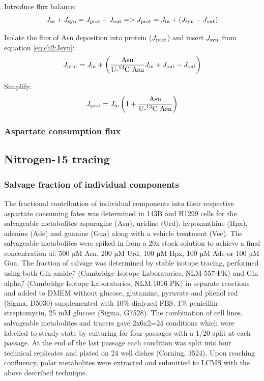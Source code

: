 Introduce flux balance:
\begin{equation}
    J_{\text{in}} + J_{\text{syn}} = J_{\text{prot}} + J_{\text{out}} => J_{\text{prot}} = J_{\text{in}} + (J_{\text{syn}} - J_{\text{out}})
\end{equation}

Isolate the flux of Asn deposition into protein ($J_{\text{prot}}$) and insert $J_{\text{syn}}$ from equation \ref{eq:ch2:Jsyn}:
\begin{equation}
    J_{\text{prot}} = J_{\text{in}} + \left( \frac{\text{Asn}}{\text{U-\textsuperscript{13}C Asn}} J_{\text{in}} + J_{\text{out}} - J_{\text{out}} \right)
\end{equation}

Simplify:
\begin{equation}
    J_{\text{prot}} = J_{\text{in}} \left( 1 + \frac{\text{Asn}}{\text{U-\textsuperscript{13}C Asn}} \right)
\label{eq:ch2:Jprot}
\end{equation}



\subsubsection{Aspartate consumption flux}











\subsection{Nitrogen-15 tracing}

\subsubsection{Salvage fraction of individual components}
The fractional contribution of individual components into their respective aspartate consuming fates was determined in 143B and H1299 cells for the salvageable metabolites asparagine (Asn), uridine (Urd), hypoxanthine (Hpx), adenine (Ade) and guanine (Gua) along with a vehicle treatment (Vec).
The salvageable metabolites were spiked-in from a 20x stock solution to achieve a final concentration of: 500 µM Asn, 200 µM Urd, 100 µM Hpx, 100 µM Ade or 100 µM Gua.
The fraction of salvage was determined by stable isotope tracing, performed using both Gln amide\=/\hNi{} (Cambridge Isotope Laboratories, NLM-557-PK) and Gln alpha\=/\hNi{} (Cambridge Isotope Laboratories, NLM-1016-PK) in separate reactions and added to DMEM without glucose, glutamine, pyruvate and phenol red (Sigma, D5030) supplemented with 10\% dialyzed FBS, 1\% penicillin-streptomycin, 25 mM glucose (Sigma, G7528).
The combination of cell lines, salvageable metabolites and tracers gave 2x6x2=24 conditions which were labelled to steady-state by culturing for four passages with a 1/20 split at each passage.
At the end of the last passage each condition was split into four technical replicates and plated on 24 well dishes (Corning, 3524).
Upon reaching confluency, polar metabolites were extracted and submitted to LCMS with the above described technique.

